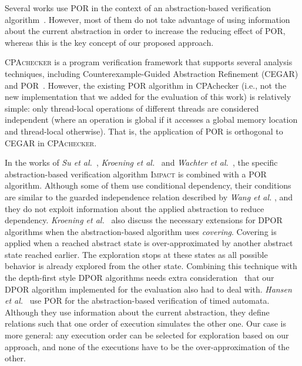 \documentclass[numbook]{svjour3}
\begin{document}
Several works use POR in the context of an abstraction-based verification algorithm~\cite{cpachecker-por, impact_por_abstraction, pichecker, hansen_diamonds, abpress, sousa_abstractions_independence, por_abstraction_timed_automata, farzan_sound_sequentialization}. However, most of them do not take advantage of using information about the current abstraction in order to increase the reducing effect of POR, whereas this is the key concept of our proposed approach.

\textsc{CPAchecker} is a program verification framework that supports several analysis techniques, including Counterexample-Guided Abstraction Refinement (CEGAR) and POR~\cite{cpachecker-por}. However, the existing POR algorithm in CPAchecker (i.e., not the new implementation that we added for the evaluation of this work) is relatively simple: only thread-local operations of different threads are considered independent (where an operation is global if it accesses a global memory location and thread-local otherwise). That is, the application of POR is orthogonal to CEGAR in \textsc{CPAchecker}.

In the works of \emph{Su et al.}~\cite{pichecker}, \emph{Kroening et al.}~\cite{abpress} and \emph{Wachter et al.}~\cite{impact_por_abstraction}, the specific abstraction-based verification algorithm \textsc{Impact} is combined with a POR algorithm. Although some of them use conditional dependency, their conditions are similar to the guarded independence relation described by \emph{Wang et al.} \cite{peephole_por}, and they do not exploit information about the applied abstraction to reduce dependency. \emph{Kroening et al.}~\cite{abpress} also discuss the necessary extensions for DPOR algorithms when the abstraction-based algorithm uses \emph{covering}. Covering is applied when a reached abstract state is over-approximated by another abstract state reached earlier. The exploration stops at these states as all possible behavior is already explored from the other state. Combining this technique with the depth-first style DPOR algorithms needs extra consideration~\cite{abpress} that our DPOR algorithm implemented for the evaluation also had to deal with. \emph{Hansen et al.}~\cite{hansen_diamonds} use POR for the abstraction-based verification of timed automata. Although they use information about the current abstraction, they define relations such that one order of execution simulates the other one. Our case is more general: any execution order can be selected for exploration based on our approach, and none of the executions have to be the over-approximation of the other.
\end{document}

